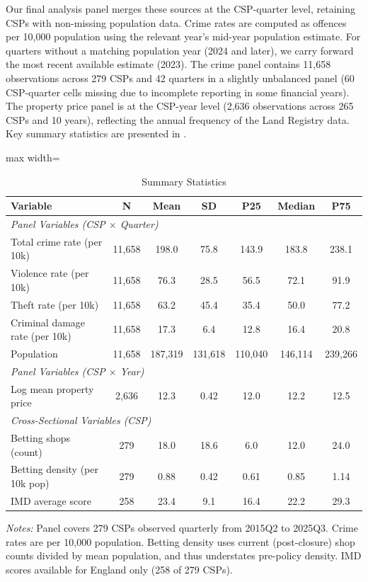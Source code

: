 \documentclass[12pt]{article}
\begin{document}
Our final analysis panel merges these sources at the CSP-quarter level, retaining CSPs with non-missing population data. Crime rates are computed as offences per 10,000 population using the relevant year's mid-year population estimate. For quarters without a matching population year (2024 and later), we carry forward the most recent available estimate (2023). The crime panel contains 11,658 observations across 279 CSPs and 42 quarters in a slightly unbalanced panel (60 CSP-quarter cells missing due to incomplete reporting in some financial years). The property price panel is at the CSP-year level (2,636 observations across 265 CSPs and 10 years), reflecting the annual frequency of the Land Registry data. Key summary statistics are presented in .

\begin{table}[H]
\centering
\caption{Summary Statistics}
\label{tab:summary}
\begin{adjustbox}{max width=\textwidth}
\begin{threeparttable}
\begin{tabular}{lcccccc}
\toprule
Variable & N & Mean & SD & P25 & Median & P75 \\
\midrule
\multicolumn{7}{l}{\textit{Panel Variables (CSP $\times$ Quarter)}} \\
Total crime rate (per 10k) & 11,658 & 198.0 & 75.8 & 143.9 & 183.8 & 238.1 \\
Violence rate (per 10k) & 11,658 & 76.3 & 28.5 & 56.5 & 72.1 & 91.9 \\
Theft rate (per 10k) & 11,658 & 63.2 & 45.4 & 35.4 & 50.0 & 77.2 \\
Criminal damage rate (per 10k) & 11,658 & 17.3 & 6.4 & 12.8 & 16.4 & 20.8 \\
Population & 11,658 & 187,319 & 131,618 & 110,040 & 146,114 & 239,266 \\
\midrule
\multicolumn{7}{l}{\textit{Panel Variables (CSP $\times$ Year)}} \\
Log mean property price & 2,636 & 12.3 & 0.42 & 12.0 & 12.2 & 12.5 \\
\midrule
\multicolumn{7}{l}{\textit{Cross-Sectional Variables (CSP)}} \\
Betting shops (count) & 279 & 18.0 & 18.6 & 6.0 & 12.0 & 24.0 \\
Betting density (per 10k pop) & 279 & 0.88 & 0.42 & 0.61 & 0.85 & 1.14 \\
IMD average score & 258 & 23.4 & 9.1 & 16.4 & 22.2 & 29.3 \\
\bottomrule
\end{tabular}
\begin{tablenotes}[flushleft]
\small
\item \textit{Notes:} Panel covers 279 CSPs observed quarterly from 2015Q2 to 2025Q3. Crime rates are per 10,000 population. Betting density uses current (post-closure) shop counts divided by mean population, and thus understates pre-policy density. IMD scores available for England only (258 of 279 CSPs).
\end{tablenotes}
\end{threeparttable}
\end{adjustbox}
\end{table}
\end{document}

